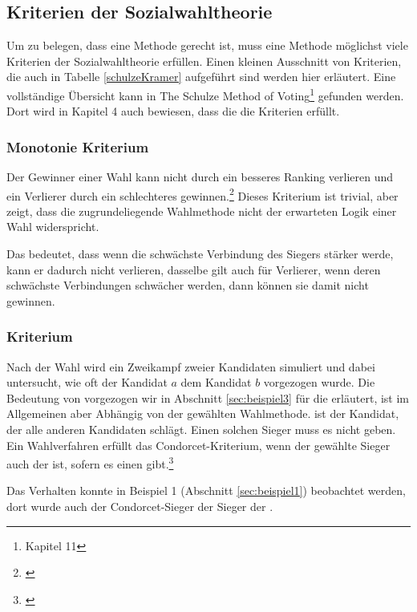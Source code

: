 \subsection{Kriterien der Sozialwahltheorie}
\label{sec:kriterienSozial}
Um zu belegen, dass eine Methode gerecht ist, muss eine Methode möglichst viele Kriterien der Sozialwahltheorie erfüllen. Einen kleinen Ausschnitt von Kriterien, die auch in Tabelle \ref{schulzeKramer} aufgeführt sind werden hier erläutert. Eine vollständige Übersicht kann in \glqq The Schulze Method
of Voting\grqq{}\footnote{\Vgl \citet{Schulze2018} Kapitel 11} gefunden werden. Dort wird in Kapitel 4 auch bewiesen, dass die \schulze die Kriterien erfüllt.


\subsubsection{Monotonie Kriterium} 
\label{sec:monotoniekriterium}
Der Gewinner einer Wahl kann nicht durch ein besseres Ranking verlieren und ein Verlierer durch ein schlechteres gewinnen.\footnote{\Vgl \citet{Woodall1996}} Dieses Kriterium ist trivial, aber zeigt, dass die zugrundeliegende Wahlmethode nicht der erwarteten Logik einer Wahl widerspricht.

Das bedeutet, dass wenn die schwächste Verbindung des Siegers stärker werde, kann er dadurch nicht verlieren, dasselbe gilt auch für Verlierer, wenn deren schwächste Verbindungen schwächer werden, dann können sie damit nicht gewinnen.

\subsubsection{\condorcet Kriterium} 
\label{sec:condorectKriterium}
Nach der Wahl wird ein Zweikampf zweier Kandidaten simuliert und dabei untersucht, wie oft der Kandidat $a$ dem Kandidat $b$ vorgezogen wurde. Die Bedeutung von \glqq vorgezogen\grqq{} wir in Abschnitt \ref{sec:beispiel3} für die \schulze erläutert, ist im Allgemeinen aber Abhängig von der gewählten Wahlmethode. \condorcetSieger ist der Kandidat, der alle anderen Kandidaten schlägt. Einen solchen Sieger muss es nicht geben. Ein Wahlverfahren erfüllt das Condorcet-Kriterium, wenn der gewählte Sieger auch der \condorcetSieger ist, sofern es einen \condorcetSieger gibt.\footnote{\Vgl \citet{Johnson2005}}

Das Verhalten konnte in Beispiel 1 (Abschnitt \ref{sec:beispiel1}) beobachtet werden, dort wurde auch der Condorcet-Sieger der Sieger der \schulze .

